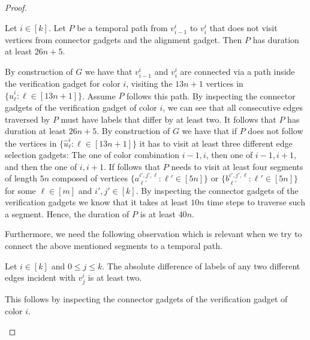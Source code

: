 \documentclass[a4paper,UKenglish,cleveref, autoref, thm-restate, anonymous]{lipics-v2021}
\begin{document}
\begin{proof}
\begin{claim}\label{claim:16}
    Let $i\in[k]$. Let $P$ be a temporal path from $v_{i-1}^i$ to $v_i^i$ that does not visit vertices from connector gadgets and the alignment gadget. Then $P$ has duration at least $26n+5$.
\end{claim}
\begin{claimproof}
    By construction of $G$ we have that $v^i_{i-1}$ and $v^i_i$ are connected via a path inside the verification gadget for color $i$, visiting the $13n+1$ vertices in $\{\hat{u}^i_\ell :  \ell\in[13n+1]\}$. Assume $P$ follows this path. By inspecting the connector gadgets of the verification gadget of color $i$, we can see that all consecutive edges traversed by $P$ must have labels that differ by at least two. It follows that $P$ has duration at least $26n+5$. By construction of $G$ we have that if $P$ does not follow the vertices in $\{\hat{u}^i_\ell :  \ell\in[13n+1]\}$ it has to visit at least three different edge selection gadgets: The one of color combination $i-1,i$, then one of $i-1,i+1$, and then the one of $i,i+1$. If follows that $P$ needs to visit at least four segments of length $5n$ composed of vertices $\{a^{i',j',\ell}_{\ell'} :  \ell'\in[5n]\}$ or $\{b^{i',j',\ell}_{\ell'} :  \ell'\in[5n]\}$ for some $\ell\in[m]$ and $i',j'\in[k]$. By inspecting the connector gadgets of the verification gadgets we know that it takes at least $10n$ time steps to traverse such a segment. Hence, the duration of $P$ is at least $40n$.
\end{claimproof}

Furthermore, we need the following observation which is relevant when we try to connect the above mentioned segments to a temporal path.

\begin{claim}\label{claim:17}
Let $i\in[k]$ and $0\le j\le k$. The absolute difference of labels of any two different edges incident with $v^i_j$ is at least two.
\end{claim}
\begin{claimproof}
    This follows by inspecting the connector gadgets of the verification gadget of color $i$.
\end{claimproof}


\end{proof}
\end{document}
